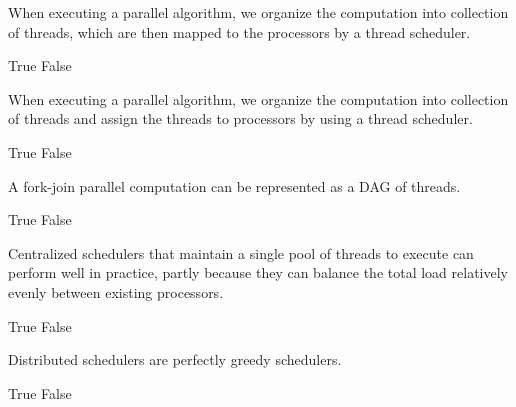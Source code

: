 \begin{cluster}
\begin{parts}
\begin{problem}[2]

When executing a parallel algorithm, we organize the computation into
collection of threads, which are then mapped to the processors by a
thread scheduler.

\begin{pickone}
\correctchoice True
\choice False
\end{pickone}
\end{problem}

\begin{problem}

When executing a parallel algorithm, we organize the computation into
collection of threads and assign the threads to processors by using a
thread scheduler.

\begin{pickone}
\correctchoice True
\choice False
\end{pickone}
\end{problem}

\begin{problem}[2]

A fork-join parallel computation can be represented as a DAG of
threads.

\begin{pickone}
\correctchoice True
\choice False
\end{pickone}
\end{problem}


\begin{problem}[2]

Centralized schedulers that maintain a single pool of threads to
execute can perform well in practice, partly because they can balance
the total load relatively evenly between existing processors.

\begin{pickone}
\choice True
\correctchoice False
\end{pickone}
\end{problem}

\begin{problem}[2]

Distributed schedulers are perfectly greedy schedulers.

\begin{pickone}
\choice True
\correctchoice False
\end{pickone}
\end{problem}


\end{parts}
\end{cluster}
